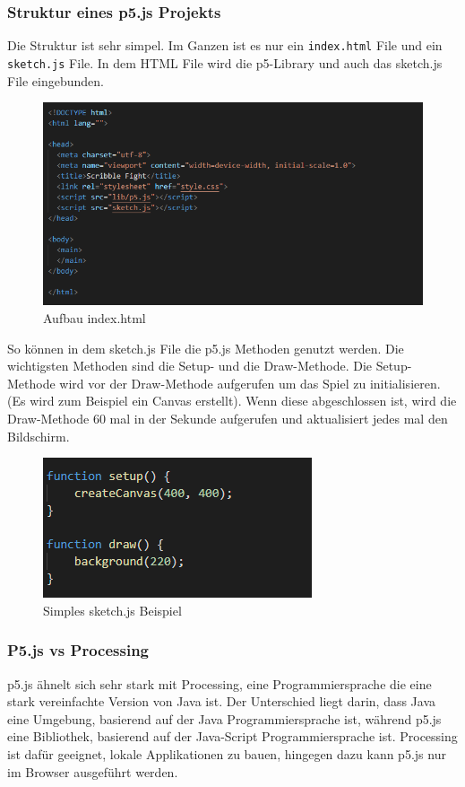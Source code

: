 \subsubsection{Struktur eines p5.js Projekts}
Die Struktur ist sehr simpel. Im Ganzen ist es nur ein \texttt{index.html} File und ein \texttt{sketch.js} File. In dem HTML File wird die p5-Library und auch das sketch.js File eingebunden.

\begin{figure}[H]
    \centering
    \includegraphics[scale=1]{pics/index html.PNG}
    \caption{Aufbau index.html}
\end{figure}

So können in dem sketch.js File die p5.js Methoden genutzt werden. Die wichtigsten Methoden sind die Setup- und die Draw-Methode.
Die Setup-Methode wird vor der Draw-Methode aufgerufen um das Spiel zu initialisieren. (Es wird zum Beispiel ein Canvas erstellt).
Wenn diese abgeschlossen ist, wird die Draw-Methode 60 mal in der Sekunde aufgerufen und aktualisiert jedes mal den Bildschirm.

\begin{figure}[H]
    \centering
    \includegraphics[scale=1]{pics/sketch.PNG}
    \caption{Simples sketch.js Beispiel}
\end{figure}

\subsubsection{P5.js vs Processing}
p5.js ähnelt sich sehr stark mit Processing, eine Programmiersprache die eine stark vereinfachte Version von Java ist.
Der Unterschied liegt darin, dass Java eine Umgebung, basierend auf der Java Programmiersprache ist, während p5.js eine Bibliothek, basierend auf der Java-Script Programmiersprache ist.
Processing ist dafür geeignet, lokale Applikationen zu bauen, hingegen dazu kann p5.js nur im Browser ausgeführt werden.

